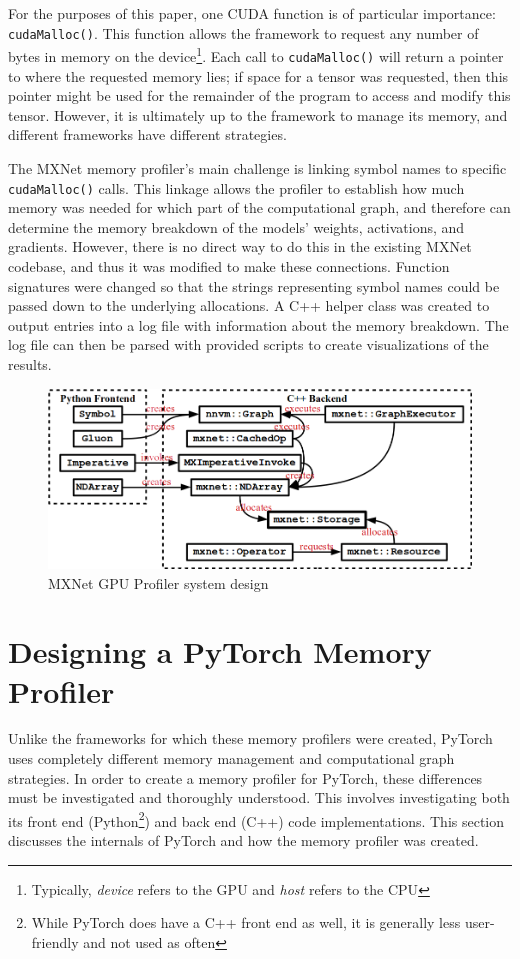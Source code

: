 \documentclass[12pt,letterpaper]{article}
\begin{document}
For the purposes of this paper, one CUDA function is of particular importance: \texttt{cudaMalloc()}. This function allows the framework to request any number of bytes in memory on the device\footnote{Typically, \textit{device} refers to the GPU and \textit{host} refers to the CPU}. Each call to \texttt{cudaMalloc()} will return a pointer to where the requested memory lies; if space for a tensor was requested, then this pointer might be used for the remainder of the program to access and modify this tensor. However, it is ultimately up to the framework to manage its memory, and different frameworks have different strategies. 
\par 

The MXNet memory profiler's main challenge is linking symbol names to specific \texttt{cudaMalloc()} calls. This linkage allows the profiler to establish how much memory was needed for which part of the computational graph, and therefore can determine the memory breakdown of the models' weights, activations, and gradients. However, there is no direct way to do this in the existing MXNet codebase, and thus it was modified to make these connections. Function signatures were changed so that the strings representing symbol names could be passed down to the underlying allocations. A C++ helper class was created to output entries into a log file with information about the memory breakdown. The log file can then be parsed with provided scripts to create visualizations of the results.
\par 

\begin{figure}[ht]
\centering
\includegraphics[width=.8\textwidth]{mxnet_profiler_design.png}
\captionsetup{width=0.7\linewidth}
\caption{MXNet GPU Profiler system design \cite{mxnet_profiler}}
\label{fig:mxnet_design}
\end{figure}

\section{Designing a PyTorch Memory Profiler}
\label{progress_to_date}
Unlike the frameworks for which these memory profilers were created, PyTorch uses completely different memory management and computational graph strategies. In order to create a memory profiler for PyTorch, these differences must be investigated and thoroughly understood. This involves investigating both its front end (Python\footnote{While PyTorch does have a C++ front end as well, it is generally less user-friendly and not used as often}) and back end (C++) code implementations. This section discusses the internals of PyTorch and how the memory profiler was created.
\end{document}
